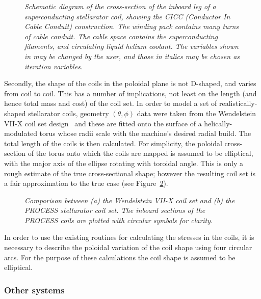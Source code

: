 \documentclass[11pt,a4paper]{report}
\begin{document}
\begin{figure}[tbph]
\caption[Stellarator coil cross-section]
{\label{fig:stell1} \textit{Schematic diagram of the
    cross-section of the inboard leg of a superconducting stellarator coil,
    showing the CICC (Conductor In Cable Conduit) construction. The winding
    pack contains many turns of cable conduit. The cable space contains the
    superconducting filaments, and circulating liquid helium coolant. The
    variables shown in  may be changed by the user, and those in
    italics may be chosen as iteration variables.}  }
\end{figure}

Secondly, the shape of the coils in the poloidal plane is not D-shaped, and
varies from coil to coil. This has a number of implications, not least on the
length (and hence total mass and cost) of the coil set. In order to model a
set of realistically-shaped stellarator coils, geometry $(\theta,\phi)$ data
were taken from the Wendelstein VII-X coil set design~\cite{W7X} and these are
fitted onto the surface of a helically-modulated torus whose radii scale with
the machine's desired radial build. The total length of the coils is then
calculated. For simplicity, the poloidal cross-section of the torus onto which
the coils are mapped is assumed to be elliptical, with the major axis of the
ellipse rotating with toroidal angle. This is only a rough estimate of the
true cross-sectional shape; however the resulting coil set is a fair
approximation to the true case (see Figure~\ref{fig:stell2}).

\begin{figure}[tbph]
\caption[Old picture of stellarator coil set]
{\label{fig:stell2}
    \textit{Comparison between (a) the Wendelstein VII-X coil set and (b) the
    PROCESS stellarator coil set. The inboard sections of the PROCESS coils
    are plotted with circular symbols for clarity.}
}
\end{figure}

In order to use the existing routines for calculating the stresses in the
coils, it is necessary to describe the poloidal variation of the coil shape
using four circular arcs. For the purpose of these calculations the coil shape
is assumed to be elliptical.

\subsubsection{Other systems}
\end{document}
